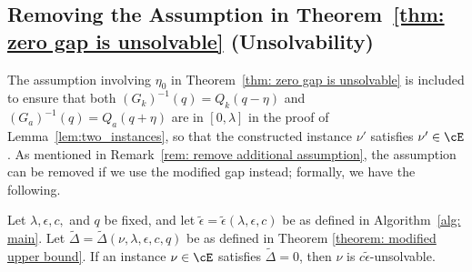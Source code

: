\subsection{Removing the Assumption in Theorem~\ref{thm: zero gap is unsolvable} (Unsolvability)}
\label{sec: assumption removal}

The assumption involving $\eta_0$ in Theorem~\ref{thm: zero gap is unsolvable} is included to ensure that both $(G_k)^{-1}(q) =  Q_k(q-\eta) $ and $(G_a)^{-1}(q) =  Q_a(q+\eta) $ are in $[0, \lambda]$ in the proof of Lemma~\ref{lem:two_instances}, so that the constructed instance $\nu'$ satisfies $\nu' \in \cE$. As mentioned in Remark~\ref{rem: remove additional assumption}, the assumption can be removed if we use the modified gap instead; formally, we have the following.


 \begin{theorem}
 \label{thm: modified zero gap is unsolvable}
    Let $\lambda, \epsilon, c,$ and $q$ be fixed, 
    and let $\tilde{\epsilon} = \tilde{\epsilon}(\lambda, \epsilon, c)$ be as defined in 
    Algorithm~\ref{alg: main}.
    Let $\tilde{\Delta} = \tilde{\Delta}(\nu, \lambda, \epsilon, c, q)$ be as defined in Theorem \ref{theorem: modified upper bound}.    
    If an instance $\nu \in \cE$ satisfies $\tilde{\Delta} = 0 $, then $\nu$ is $c\tilde{\epsilon}$-unsolvable.
 \end{theorem}


